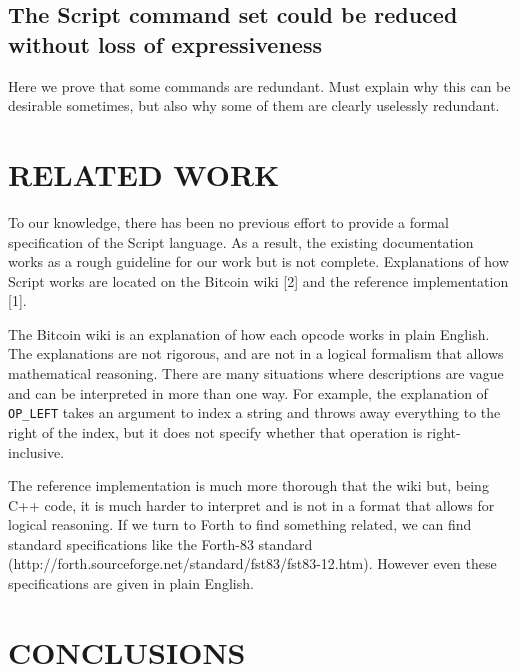 \documentclass[letterpaper, 10 pt, conference]{ieeeconf}
\begin{document}
\subsection{The Script command set could be reduced without loss of expressiveness}
Here we prove that some commands are redundant. Must explain why this can be desirable sometimes, but also why some of them are clearly uselessly redundant.


\section{RELATED WORK}

To our knowledge, there has been no previous effort to provide a formal specification of the Script language. As a result, the existing documentation works as a rough guideline for our work but is not complete. Explanations of how Script works are located on the Bitcoin wiki [2] and the reference implementation [1].  

The Bitcoin wiki is an explanation of how each opcode works in plain English. The explanations are not rigorous, and are not in a logical formalism that allows mathematical reasoning. There are many situations where descriptions are vague and can be interpreted in more than one way.  For example, the explanation of \texttt{OP\_LEFT} takes an argument to index a string and throws away everything to the right of the index, but it does not specify whether that operation is right-inclusive.

The reference implementation is much more thorough that the wiki but, being C++ code, it is much harder to interpret and is not in a format that allows for logical reasoning. If we turn to Forth to find something related, we can find standard specifications like the Forth-83 standard (http://forth.sourceforge.net/standard/fst83/fst83-12.htm). However even these specifications are given in plain English.


\section{CONCLUSIONS}

\addtolength{\textheight}{-12cm}   %
\end{document}

